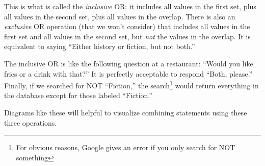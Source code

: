 This is what is called the \textit{inclusive} OR; it includes all values in the first set, plus all values in the second set, plus all values in the overlap.  There is also an \textit{exclusive} OR operation (that we won't consider) that includes all values in the first set and all values in the second set, but \textit{not} the values in the overlap.  It is equivalent to saying ``Either history or fiction, but not both.''

The inclusive OR is like the following question at a restaurant: ``Would you like fries or a drink with that?''  It is perfectly acceptable to respond ``Both, please.''\\

Finally, if we searched for NOT ``Fiction,'' the search\footnote{For obvious reasons, Google gives an error if you only search for NOT something} would return everything in the database except for those labeled ``Fiction.''\\

\begin{center}
\end{center}

Diagrams like these will helpful to visualize combining statements using these three operations.
\pagebreak

